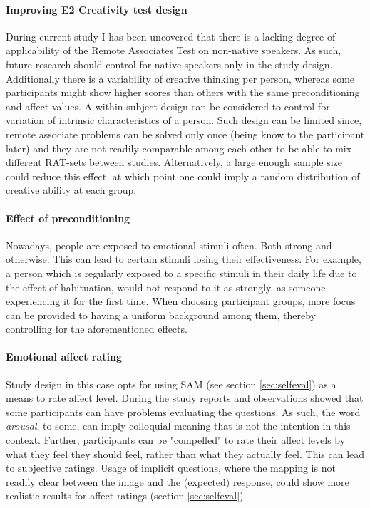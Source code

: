 \paragraph{Improving E2 Creativity test design}
During current study I has been uncovered that there is a lacking degree of applicability of the Remote Associates Test on non-native speakers. As such, future research should control for native speakers only in the study design. Additionally there is a variability of creative thinking per person, whereas some participants might show higher scores than others with the same preconditioning and affect values. A within-subject design can be considered to control for variation of intrinsic characteristics of a person. Such design can be limited since, remote associate problems can be solved only once (being know to the participant later) and they are not readily comparable among each other to be able to mix different RAT-sets between studies. Alternatively, a large enough sample size could reduce this effect, at which point one could imply a random distribution of creative ability at each group.

\paragraph{Effect of preconditioning}

Nowadays, people are exposed to emotional stimuli often. Both strong and otherwise. This can lead to certain stimuli losing their effectiveness. For example, a person which is regularly exposed to a specific stimuli in their daily life due to the effect of habituation, would not respond to it as strongly, as someone experiencing it for the first time. When choosing participant groups, more focus can be provided to having a uniform background among them, thereby controlling for the aforementioned effects.

\paragraph{Emotional affect rating}
Study design in this case opts for using SAM (see section \ref{sec:selfeval}) as a means to rate affect level. During the study reports and observations showed that some participants can have problems evaluating the questions. As such, the word \textit{arousal}, to some, can imply colloquial meaning that is not the intention in this context. Further, participants can be "compelled" to rate their affect levels by what they feel they should feel, rather than what they actually feel. This can lead to subjective ratings.
Usage of implicit questions, where the mapping is not readily clear between the image and the (expected) response, could show more realistic results for affect ratings (section \ref{sec:selfeval}).

